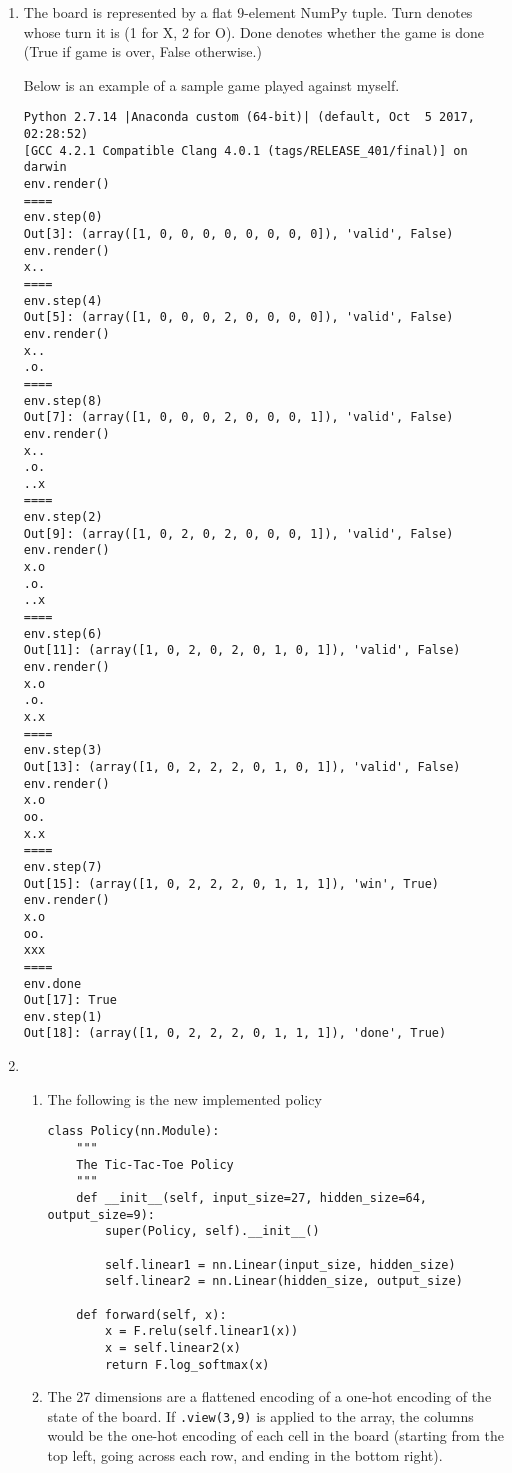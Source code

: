 \documentclass[10pt,letterpaper]{article}
\begin{document}
	\begin{enumerate}
		\item %
		The board is represented by a flat 9-element NumPy tuple.
		Turn denotes whose turn it is (1 for X, 2 for O).
		Done denotes whether the game is done (True if game is over, False otherwise.)

		Below is an example of a sample game played against myself.
		\begin{verbatim}
Python 2.7.14 |Anaconda custom (64-bit)| (default, Oct  5 2017, 02:28:52)
[GCC 4.2.1 Compatible Clang 4.0.1 (tags/RELEASE_401/final)] on darwin
env.render()
====
env.step(0)
Out[3]: (array([1, 0, 0, 0, 0, 0, 0, 0, 0]), 'valid', False)
env.render()
x..
====
env.step(4)
Out[5]: (array([1, 0, 0, 0, 2, 0, 0, 0, 0]), 'valid', False)
env.render()
x..
.o.
====
env.step(8)
Out[7]: (array([1, 0, 0, 0, 2, 0, 0, 0, 1]), 'valid', False)
env.render()
x..
.o.
..x
====
env.step(2)
Out[9]: (array([1, 0, 2, 0, 2, 0, 0, 0, 1]), 'valid', False)
env.render()
x.o
.o.
..x
====
env.step(6)
Out[11]: (array([1, 0, 2, 0, 2, 0, 1, 0, 1]), 'valid', False)
env.render()
x.o
.o.
x.x
====
env.step(3)
Out[13]: (array([1, 0, 2, 2, 2, 0, 1, 0, 1]), 'valid', False)
env.render()
x.o
oo.
x.x
====
env.step(7)
Out[15]: (array([1, 0, 2, 2, 2, 0, 1, 1, 1]), 'win', True)
env.render()
x.o
oo.
xxx
====
env.done
Out[17]: True
env.step(1)
Out[18]: (array([1, 0, 2, 2, 2, 0, 1, 1, 1]), 'done', True)
		\end{verbatim}
		\item %
		\begin{enumerate}
			\item %
			The following is the new implemented policy
\begin{lstlisting}
class Policy(nn.Module):
    """
    The Tic-Tac-Toe Policy
    """
    def __init__(self, input_size=27, hidden_size=64, output_size=9):
        super(Policy, self).__init__()

        self.linear1 = nn.Linear(input_size, hidden_size)
        self.linear2 = nn.Linear(hidden_size, output_size)

    def forward(self, x):
        x = F.relu(self.linear1(x))
        x = self.linear2(x)
        return F.log_softmax(x)
\end{lstlisting}
			\item %
			The 27 dimensions are a flattened encoding of a one-hot encoding of the state of the board.
			If \verb|.view(3,9)| is applied to the array, the columns would be the one-hot encoding of each cell in the board (starting from the top left, going across each row, and ending in the bottom right).


\end{enumerate}
\end{enumerate}
\end{document}

